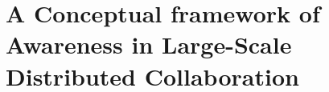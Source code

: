 \graphicspath{{Figures/}}

\chapter{A Conceptual framework of Awareness in Large-Scale Distributed Collaboration} %
\label{cha:the_conceptual_framework}





 

